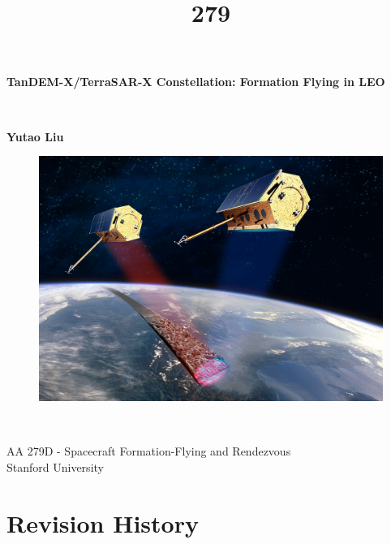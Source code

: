 \documentclass[11pt,letterpaper]{article}
\newcommand{\userName}{Yutao Liu}
\begin{document}
\title{279}
\begin{titlepage}
    \begin{center}
        \vspace*{1cm}
        
        \Huge
        \textbf{TanDEM-X/TerraSAR-X Constellation: Formation Flying in LEO}
        
        \vspace{0.5cm}
        \LARGE
        \ 
        
        \vspace{1.00cm}
        \textbf{\userName}
        \vspace{1.00cm}
        
        \vfill
        \begin{figure}[H]
		\centering 
		\includegraphics[width = 5.5in]{Figures/tt.jpg}
		\label{Figure: Title Graphic}
		\end{figure}
        \        
        
        \Large
        AA 279D - Spacecraft Formation-Flying and Rendezvous\\
        Stanford University\\
        
    \end{center}
\end{titlepage}

\section*{Revision History}
\end{document}
